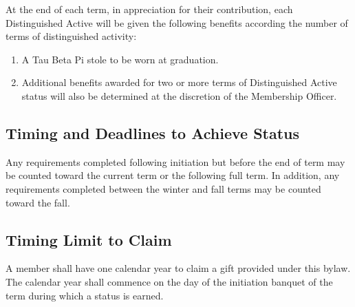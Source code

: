 At the end of each term, in appreciation for their contribution, each
Distinguished Active will be given the following benefits according the number of terms
of distinguished activity:
\begin{enumerate}
    \item {}
    A Tau Beta Pi stole to be worn at graduation.
    \item {}
    Additional benefits awarded for two or more terms of Distinguished
Active status will also be determined at the discretion of the Membership Officer.
\end{enumerate}


\subsection{Timing and Deadlines to Achieve Status} \label{D.5}

Any requirements completed
following initiation but before the end of term may be counted toward the current
term or the following full term. In addition, any requirements completed between the
winter and fall terms may be counted toward the fall.


\subsection{Timing Limit to Claim} \label{D.6}

A member shall have one calendar year to claim
a gift provided under this bylaw. The calendar year shall commence on the day of the
initiation banquet of the term during which a status is earned.



